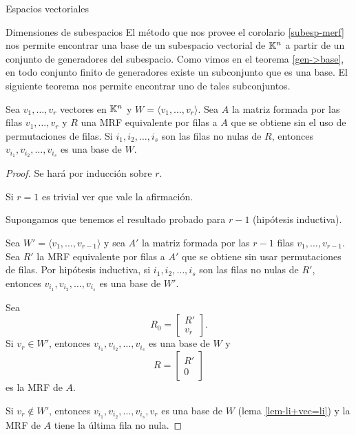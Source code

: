 \begin{chapter}{Espacios vectoriales}
\begin{section}{Dimensiones de subespacios}
    El método que nos provee el corolario  \ref{subesp-merf} nos permite encontrar una base de un subespacio vectorial de $\mathbb K^n$ a partir de un conjunto de generadores del subespacio. Como vimos en el teorema \ref{gen->base},  en todo conjunto finito de generadores existe un subconjunto que es una base. El siguiente teorema nos permite encontrar uno de tales subconjuntos. 

    
    \begin{teorema}
        Sea $v_1,\ldots, v_r$ vectores en $\mathbb K^n$ y $W = \langle  v_1,\ldots, v_r \rangle$. Sea $A$ la matriz formada por las filas $v_1,\ldots, v_r$ y $R$ una MRF equivalente por filas a $A$ que se obtiene sin el uso de permutaciones de filas. Si $i_1,i_2,\ldots,i_s$ son las filas no nulas de $R$,  entonces $v_{i_1},v_{i_2},\ldots,v_{i_s}$ es una base de $W$.
    \end{teorema}
    \begin{proof}
        Se hará por inducción sobre $r$. 
        
        Si $r = 1$ es trivial ver que vale la afirmación. 
        
        Supongamos que tenemos el resultado probado para $r-1$ (hipótesis inductiva).
    	
        Sea $W' = \langle  v_1,\ldots, v_{r-1} \rangle$ y sea $A'$ la matriz formada por las $r-1$ filas $v_1,\ldots, v_{r-1}$. 		
        Sea $R'$ la MRF equivalente por filas a $A'$ que se obtiene sin usar permutaciones de filas. Por hipótesis inductiva, si $i_1,i_2,\ldots,i_s$ son las filas no nulas de $R'$,  entonces $v_{i_1},v_{i_2},\ldots,v_{i_s}$ es una base de $W'$.
        
        Sea
        \begin{equation*}
            R_0 = \begin{bmatrix}
            R' \\ v_r
            \end{bmatrix}.
        \end{equation*}
        Si $v_r \in W'$, entonces  $v_{i_1},v_{i_2},\ldots,v_{i_s}$ es una base de $W$ y 
        \begin{equation*}
        R = \begin{bmatrix}
        R' \\ 0
        \end{bmatrix}
        \end{equation*}
        es la MRF de $A$.
        
        Si $v_r \not\in W'$, entonces  $v_{i_1},v_{i_2},\ldots,v_{i_s}, v_r$ es una base de $W$ (lema \ref{lem-li+vec=li}) y la MRF de $A$ tiene la última fila no nula.  
    \end{proof}



\end{section}
\end{chapter}
